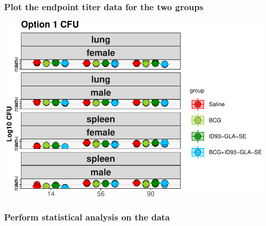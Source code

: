 \documentclass[
]{book}
\newenvironment{Shaded}{\begin{snugshade}}{\end{snugshade}}
\newcommand{\AttributeTok}[1]{\textcolor[rgb]{0.77,0.63,0.00}{#1}}
\newcommand{\DecValTok}[1]{\textcolor[rgb]{0.00,0.00,0.81}{#1}}
\newcommand{\FunctionTok}[1]{\textcolor[rgb]{0.00,0.00,0.00}{#1}}
\newcommand{\NormalTok}[1]{#1}
\newcommand{\OtherTok}[1]{\textcolor[rgb]{0.56,0.35,0.01}{#1}}
\newcommand{\SpecialCharTok}[1]{\textcolor[rgb]{0.00,0.00,0.00}{#1}}
\begin{document}
\hypertarget{plot-the-endpoint-titer-data-for-the-two-groups}{%
\subsubsection{Plot the endpoint titer data for the two groups}\label{plot-the-endpoint-titer-data-for-the-two-groups}}

\begin{Shaded}
\end{Shaded}

\includegraphics{csu-impactb_files/figure-latex/unnamed-chunk-33-1.pdf}

\hypertarget{perform-statistical-analysis-on-the-data}{%
\subsubsection{Perform statistical analysis on the data}\label{perform-statistical-analysis-on-the-data}}
\end{document}
